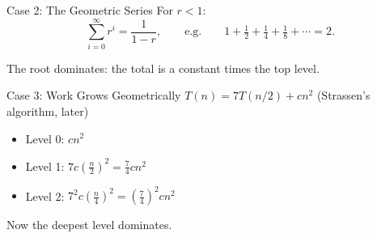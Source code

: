 \documentclass[10pt,aspectratio=169]{beamer}
\begin{document}
\begin{frame}{Case 2: The Geometric Series}
  For $r < 1$:
  \[
    \sum_{i=0}^{\infty} r^i = \frac{1}{1-r},
    \qquad\text{e.g.}\qquad
    1 + \tfrac12 + \tfrac14 + \tfrac18 + \cdots = 2.
  \]

  \bigskip
  \begin{center}
  \end{center}

  \bigskip
  \begin{center}
    The \alert{root} dominates: the total is a constant times the top level.
  \end{center}
\end{frame}

\begin{frame}{Case 3: Work Grows Geometrically}
  $T(n) = 7T(n/2) + cn^2$ \quad (Strassen's algorithm, later)

  \bigskip
  \begin{itemize}
    \item Level 0: \quad $cn^2$
    \item Level 1: \quad $7c\left(\frac{n}{2}\right)^2 = \frac{7}{4}cn^2$
    \item Level 2: \quad $7^2 c\left(\frac{n}{4}\right)^2 = \left(\frac{7}{4}\right)^2 cn^2$
  \end{itemize}

  \bigskip
  \begin{center}
  \end{center}

  \bigskip
  \begin{center}
    Now the \alert{deepest} level dominates.
  \end{center}
\end{frame}
\end{document}
